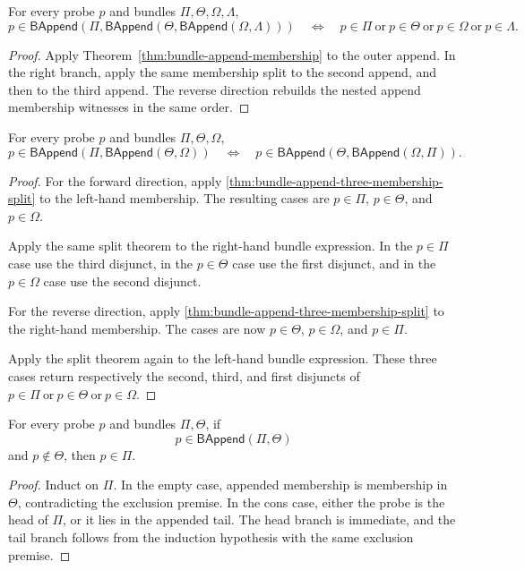 \begin{theorem}
\label{thm:bundle-append-four-membership-split}
For every probe $p$ and bundles $\Pi,\Theta,\Omega,\Lambda$,
$$
p\in\mathsf{BAppend}(\Pi,\mathsf{BAppend}(\Theta,\mathsf{BAppend}(\Omega,\Lambda)))
\quad\Longleftrightarrow\quad
p\in\Pi \ \text{or}\ p\in\Theta \ \text{or}\ p\in\Omega \ \text{or}\ p\in\Lambda .
$$
\end{theorem}
\begin{proof}
Apply Theorem~\ref{thm:bundle-append-membership} to the outer append. In the
right branch, apply the same membership split to the second append, and then to
the third append. The reverse direction rebuilds the nested append membership
witnesses in the same order.
\end{proof}

\begin{theorem}
\label{thm:bundle-append-three-segment-membership-rotation}
For every probe $p$ and bundles $\Pi,\Theta,\Omega$,
$$
p\in\mathsf{BAppend}(\Pi,\mathsf{BAppend}(\Theta,\Omega))
\quad\Longleftrightarrow\quad
p\in\mathsf{BAppend}(\Theta,\mathsf{BAppend}(\Omega,\Pi)).
$$
\end{theorem}
\begin{proof}
For the forward direction, apply
\autoref{thm:bundle-append-three-membership-split} to the left-hand
membership. The resulting cases are $p\in\Pi$, $p\in\Theta$, and
$p\in\Omega$.

Apply the same split theorem to the right-hand bundle expression. In the
$p\in\Pi$ case use the third disjunct, in the $p\in\Theta$ case use the first
disjunct, and in the $p\in\Omega$ case use the second disjunct.

For the reverse direction, apply
\autoref{thm:bundle-append-three-membership-split} to the right-hand
membership. The cases are now $p\in\Theta$, $p\in\Omega$, and $p\in\Pi$.

Apply the split theorem again to the left-hand bundle expression. These three
cases return respectively the second, third, and first disjuncts of
$p\in\Pi \ \text{or}\ p\in\Theta \ \text{or}\ p\in\Omega$.
\end{proof}

\begin{theorem}
\label{thm:bundle-append-membership-left-of-not-right}
For every probe \(p\) and bundles \(\Pi,\Theta\), if
$$
p\in\mathsf{BAppend}(\Pi,\Theta)
$$
and \(p\notin\Theta\), then \(p\in\Pi\).
\end{theorem}
\begin{proof}
Induct on \(\Pi\). In the empty case, appended membership is membership in
\(\Theta\), contradicting the exclusion premise. In the cons case, either the
probe is the head of \(\Pi\), or it lies in the appended tail. The head branch is
immediate, and the tail branch follows from the induction hypothesis with the
same exclusion premise.
\end{proof}

